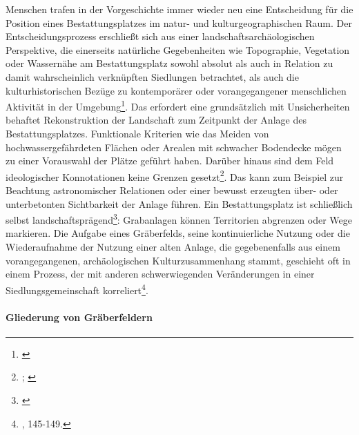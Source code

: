 \documentclass[openany,twoside,twocolumn]{book}
\let\rmarkdownfootnote\footnote%
\def\footnote{\protect\rmarkdownfootnote}
\begin{document}
Menschen trafen in der Vorgeschichte immer wieder neu eine Entscheidung
für die Position eines Bestattungsplatzes im natur- und
kulturgeographischen Raum. Der Entscheidungsprozess erschließt sich aus
einer landschaftsarchäologischen Perspektive, die einerseits natürliche
Gegebenheiten wie Topographie, Vegetation oder Wassernähe am
Bestattungsplatz sowohl absolut als auch in Relation zu damit
wahrscheinlich verknüpften Siedlungen betrachtet, als auch die
kulturhistorischen Bezüge zu kontemporärer oder vorangegangener
menschlichen Aktivität in der Umgebung\footnote{\textcite{balee_historical_1998}}.
Das erfordert eine grundsätzlich mit Unsicherheiten behaftet
Rekonstruktion der Landschaft zum Zeitpunkt der Anlage des
Bestattungsplatzes. Funktionale Kriterien wie das Meiden von
hochwassergefährdeten Flächen oder Arealen mit schwacher Bodendecke
mögen zu einer Vorauswahl der Plätze geführt haben. Darüber hinaus sind
dem Feld ideologischer Konnotationen keine Grenzen gesetzt\footnote{\textcite{artelius_bronze_1998};
  \textcite{stjernquist_introduction_1992-1}}. Das kann zum Beispiel zur
Beachtung astronomischer Relationen oder einer bewusst erzeugten über-
oder unterbetonten Sichtbarkeit der Anlage führen. Ein Bestattungsplatz
ist schließlich selbst landschaftsprägend\footnote{\textcite{enninger_friedhofe_1989}}:
Grabanlagen können Territorien abgrenzen oder Wege markieren. Die
Aufgabe eines Gräberfelds, seine kontinuierliche Nutzung oder die
Wiederaufnahme der Nutzung einer alten Anlage, die gegebenenfalls aus
einem vorangegangenen, archäologischen Kulturzusammenhang stammt,
geschieht oft in einem Prozess, der mit anderen schwerwiegenden
Veränderungen in einer Siedlungsgemeinschaft korreliert\footnote{\textcite{hofmann_rituelle_2008},
  145-149.}.

\hypertarget{gliederung-von-graberfeldern}{%
\paragraph{Gliederung von
Gräberfeldern}\label{gliederung-von-graberfeldern}}
\end{document}
